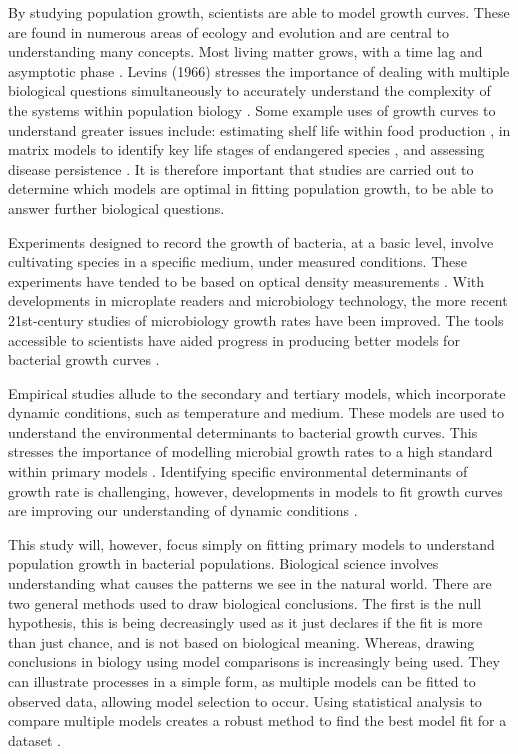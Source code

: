 \documentclass[11pt]{article}
\begin{document}
By studying population growth, scientists are able to model growth curves. These are found in numerous areas of ecology and evolution and are central to understanding many concepts. Most living matter grows, with a time lag and asymptotic phase \cite{zwietering_modeling_1990,levins_strategy_1966}. Levins (1966) stresses the importance of dealing with multiple biological questions simultaneously to accurately understand the complexity of the systems within population biology \cite{levins_strategy_1966}. Some example uses of growth curves to understand greater issues include: estimating shelf life within food production \cite{grijspeerdt_estimating_1999}, in matrix models to identify key life stages of endangered species \cite{wisdom_life_2000}, and assessing disease persistence \cite{gao_disease_1992}. It is therefore important that studies are carried out to determine which models are optimal in fitting population growth, to be able to answer further biological questions. 

Experiments designed to record the growth of bacteria, at a basic level, involve cultivating species in a specific medium, under measured conditions. These experiments have tended to be based on optical density measurements \cite{krishnamurthi_new_2021, zwietering_modeling_1990}. With developments in microplate readers and microbiology technology, the more recent 21st-century studies of microbiology growth rates have been improved. The tools accessible to scientists have aided progress in producing better models for bacterial growth curves \cite{krishnamurthi_new_2021}. 

Empirical studies allude to the secondary and tertiary models, which incorporate dynamic conditions, such as temperature and medium. These models are used to understand the environmental determinants to bacterial growth curves. This stresses the importance of modelling microbial growth rates to a high standard within primary models \cite{peleg_microbial_2011}. Identifying specific environmental determinants of growth rate is challenging, however, developments in models to fit growth curves are improving our understanding of dynamic conditions \cite{fujikawa_new_2004, sibly_population_2002}. 

This study will, however, focus simply on fitting primary models to understand population growth in bacterial populations. Biological science involves understanding what causes the patterns we see in the natural world. There are two general methods used to draw biological conclusions. The first is the null hypothesis, this is being decreasingly used as it just declares if the fit is more than just chance, and is not based on biological meaning. Whereas, drawing conclusions in biology using model comparisons is increasingly being used. They can illustrate processes in a simple form, as multiple models can be fitted to observed data, allowing model selection to occur. Using statistical analysis to compare multiple models creates a robust method to find the best model fit for a dataset \cite{johnson_model_2004}. 
\end{document}
